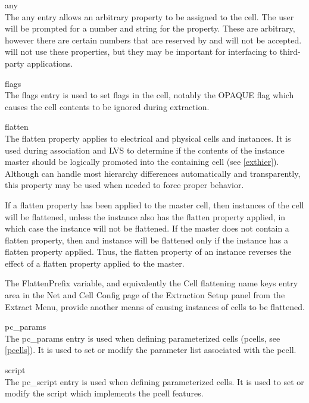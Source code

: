 \begin{description}
\item{\cb any}\\
The {\cb any} entry allows an arbitrary property to be assigned to
the cell.  The user will be prompted for a number and string for the
property.  These are arbitrary, however there are certain numbers
that are reserved by {\Xic} and will not be accepted.  {\Xic} will
not use these properties, but they may be important for interfacing
to third-party applications.

\item{\cb flags}\\
The {\cb flags} entry is used to set flags in the cell, notably the
{\et OPAQUE} flag which causes the cell contents to be ignored during
extraction.

\item{\cb flatten}\\
The {\et flatten} property applies to electrical and physical cells
and instances.  It is used during association and LVS to determine if
the contents of the instance master should be logically promoted into
the containing cell (see \ref{exthier}).  Although {\Xic} can handle
most hierarchy differences automatically and transparently, this
property may be used when needed to force proper behavior.

If a {\et flatten} property has been applied to the master cell, then
instances of the cell will be flattened, unless the instance also has
the {\cb flatten} property applied, in which case the instance will
not be flattened.  If the master does not contain a {\et flatten}
property, then and instance will be flattened only if the instance has
a {\et flatten} property applied.  Thus, the {\et flatten} property of
an instance reverses the effect of a {\et flatten} property applied to
the master.

The {\et FlattenPrefix} variable, and equivalently the {\cb Cell
flattening name keys} entry area in the {\cb Net and Cell Config} page
of the {\cb Extraction Setup} panel from the {\cb Extract Menu},
provide another means of causing instances of cells to be flattened.

\item{\cb pc\_params}\\
The {\cb pc\_params} entry is used when defining parameterized cells
(pcells, see \ref{pcells}).  It is used to set or modify the parameter
list associated with the pcell.

\item{\cb script}\\
The {\cb pc\_script} entry is used when defining parameterized cells. 
It is used to set or modify the script which implements the pcell
features.
\end{description}

